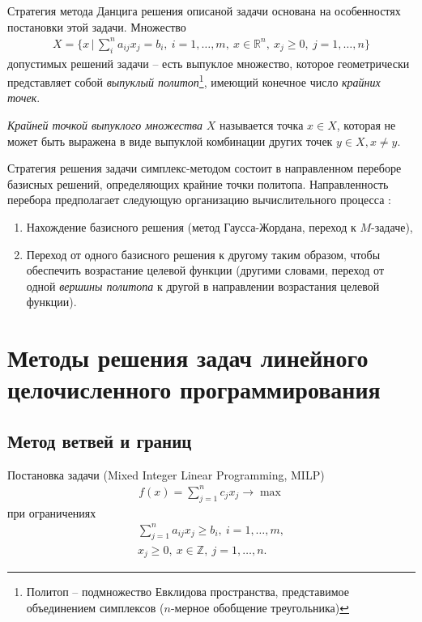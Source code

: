 \documentclass[%
	11pt,
	a4paper,
	utf8,
		]{article}
\begin{document}
Стратегия метода Данцига решения описаной задачи основана на особенностях постановки этой задачи. Множество
\begin{align*}
	X = \{ x \, | \, \sum_{i}^{n} a_{ij} x_j = b_i, \ i = 1, \ldots, m, \ x \in \mathbb{R}^n, \ x_j \geqslant 0, \ j = 1, \ldots, n \}
\end{align*}
допустимых решений задачи -- есть выпуклое множество, которое геометрически представляет собой \emph{выпуклый политоп}\footnote{Политоп -- подмножество Евклидова пространства, представимое объединением симплексов ($ n $-мерное обобщение треугольника)}, имеющий конечное число \emph{крайних точек}.

\emph{Крайней точкой выпуклого множества} $ X $ называется точка $ x \in X $, которая не может быть выражена в виде выпуклой комбинации других точек $ y \in X, x \neq y $.

Стратегия решения задачи симплекс-методом состоит в направленном переборе базисных решений, определяющих крайние точки политопа. Направленность перебора предполагает следующую организацию вычислительного процесса \cite{panteleev}:
\begin{enumerate}
	\item Нахождение базисного решения (метод Гаусса-Жордана, переход к $ M $-задаче),
	
	\item Переход от одного базисного решения к другому таким образом, чтобы обеспечить возрастание целевой функции (другими словами, переход от одной \emph{вершины политопа} к другой в направлении возрастания целевой функции).
\end{enumerate}

\section{Методы решения задач линейного целочисленного программирования}

\subsection{Метод ветвей и границ}

Постановка задачи (Mixed Integer Linear Programming, MILP)
\begin{align*}
	f(x) = \sum_{j=1}^{n} c_j x_j \rightarrow \max
\end{align*}
при ограничениях
\begin{align*}
	\sum_{j=1}^{n} a_{ij} x_j \geqslant b_i, \ i = 1, \ldots, m,\\
	x_j \geqslant 0, \ x \in \mathbb{Z}, \ j = 1, \ldots, n.
\end{align*}
\end{document}
